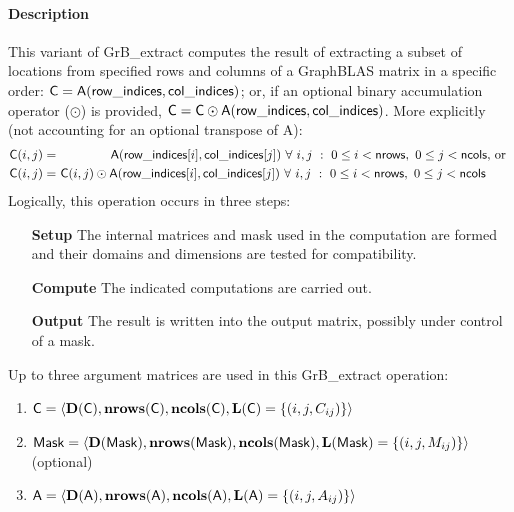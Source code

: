\paragraph{Description}

This variant of {\sf GrB\_extract} computes the result of extracting a subset of
locations from specified rows and columns of a GraphBLAS matrix in a specific 
order: ${\sf C} = {\sf A}({\sf row\_indices},{\sf col\_indices})$; or, if an 
optional binary accumulation operator ($\odot$) is provided, 
${\sf C} = {\sf C} \odot {\sf A}({\sf row\_indices},{\sf col\_indices})$.  
More explicitly (not accounting for an optional transpose of {\sf A}):
\[
\begin{aligned}
    {\sf C}(i,j) = &\ \ \ \ \ \ \ \ \ \ \ \ \ {\sf A}({\sf row\_indices}[i],{\sf col\_indices}[j]) 
    \ \forall \ i,j \ : \ 0 \leq i < {\sf nrows},\ 0 \leq j < {\sf ncols} \mbox{,~or~}
    \\
    {\sf C}(i,j) = &\ {\sf C}(i,j) \odot {\sf A}({\sf row\_indices}[i],{\sf col\_indices}[j])
    \ \forall \ i,j \ : \ 0 \leq i < {\sf nrows},\ 0 \leq j < {\sf ncols}
\end{aligned}
\]  
Logically, this operation occurs in three steps:
\begin{enumerate}[leftmargin=0.75in]
\item[\bf Setup] The internal matrices and mask used in the computation are formed 
and their domains and dimensions are tested for compatibility.
\item[\bf Compute] The indicated computations are carried out.
\item[\bf Output] The result is written into the output matrix, possibly under 
control of a mask.
\end{enumerate}

Up to three argument matrices are used in this {\sf GrB\_extract} operation:
\begin{enumerate}
	\item ${\sf C} = \langle \bold{D}({\sf C}),\bold{nrows}({\sf C}),
    \bold{ncols}({\sf C}),\bold{L}({\sf C}) = \{(i,j,C_{ij}) \} \rangle$
    
	\item ${\sf Mask} = \langle \bold{D}({\sf Mask}),\bold{nrows}({\sf Mask}),
    \bold{ncols}({\sf Mask}),\bold{L}({\sf Mask}) = \{(i,j,M_{ij}) \} \rangle$ (optional)

	\item ${\sf A} = \langle \bold{D}({\sf A}),\bold{nrows}({\sf A}),
    \bold{ncols}({\sf A}),\bold{L}({\sf A}) = \{(i,j,A_{ij}) \} \rangle$
\end{enumerate}

